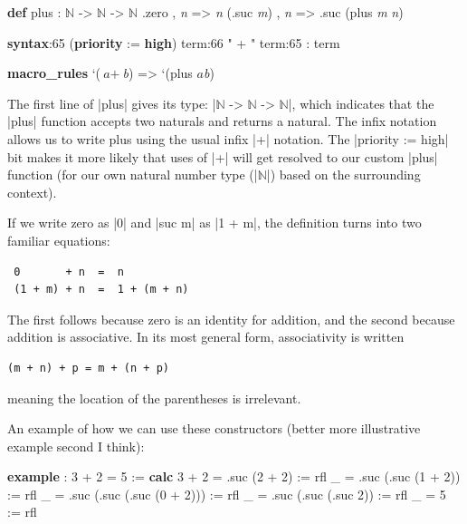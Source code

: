 \documentclass{memoir}
\newcommand{\PLFANat}{\ensuremath{\mathbb{N}}}
\begin{document}
\par
\begin{LeanVerbatim}
\textbf{def} plus : \PLFANat{} -> \PLFANat{} -> \PLFANat{}
     .zero , \textit{n}    => \textit{n}
     (.suc \textit{m}) , \textit{n} => .suc (plus \textit{m} \textit{n})

\textbf{syntax}:65 (\textbf{priority} := \textbf{high}) term:66 " + " term:65 : term

\textbf{macro_rules}
   `($\textit{a} + $\textit{b}) => `(plus $\textit{a} $\textit{b})
\end{LeanVerbatim}

\par
The first line of \LeanVerb|plus| gives its type: \LeanVerb|\PLFANat{} -> \PLFANat{} -> \PLFANat{}|, which indicates that
the \LeanVerb|plus| function accepts two naturals and returns a natural. The infix
notation allows us to write plus using the usual infix \LeanVerb|+| notation. The
\LeanVerb|priority := high| bit makes it more likely that uses of
\LeanVerb|+| will get resolved to our custom \LeanVerb|plus| function (for our own natural
number type (\LeanVerb|\PLFANat{}|) based on the surrounding context).

\par
If we write zero as \LeanVerb|0| and \LeanVerb|suc m| as \LeanVerb|1 + m|, the definition turns into two familiar equations:

\par
\begin{verbatim}
 0       + n  =  n
 (1 + m) + n  =  1 + (m + n)
\end{verbatim}

\par
\par\noindent The first follows because zero is an identity for addition, and the second because addition is associative.
In its most general form, associativity is written\begin{verbatim}
(m + n) + p = m + (n + p)
\end{verbatim}
meaning the location of the parentheses is irrelevant.

\par
An example of how we can use these constructors (better more illustrative
example second I think):

\par
\begin{LeanVerbatim}
\textbf{example} : 3 + 2 = 5 :=
  \textbf{calc}
      3 + 2
      = .suc (2 + 2)                 := rfl
      _ = .suc (.suc (1 + 2))        := rfl
      _ = .suc (.suc (.suc (0 + 2))) := rfl
      _ = .suc (.suc (.suc 2))       := rfl
      _ = 5                          := rfl
\end{LeanVerbatim}
\end{document}
